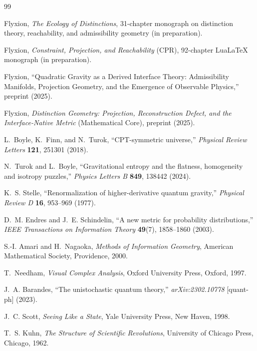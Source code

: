 \documentclass[12pt,a4paper]{book}
\theoremstyle{remark}
\theoremstyle{definition}
\begin{document}
\newpage

\begin{thebibliography}{99}

Flyxion,
\textit{The Ecology of Distinctions},
31-chapter monograph on distinction theory, reachability, and admissibility
geometry (in preparation).

Flyxion,
\textit{Constraint, Projection, and Reachability} (CPR),
92-chapter LuaLaTeX monograph (in preparation).

Flyxion,
``Quadratic Gravity as a Derived Interface Theory:
Admissibility Manifolds, Projection Geometry, and the Emergence of
Observable Physics,''
preprint (2025).

Flyxion,
\textit{Distinction Geometry: Projection, Reconstruction Defect, and the
Interface-Native Metric} (Mathematical Core),
preprint (2025).

L.~Boyle, K.~Finn, and N.~Turok,
``CPT-symmetric universe,''
\textit{Physical Review Letters} \textbf{121}, 251301 (2018).

N.~Turok and L.~Boyle,
``Gravitational entropy and the flatness, homogeneity and isotropy puzzles,''
\textit{Physics Letters B} \textbf{849}, 138442 (2024).

K.~S. Stelle,
``Renormalization of higher-derivative quantum gravity,''
\textit{Physical Review D} \textbf{16}, 953--969 (1977).

D.~M. Endres and J.~E. Schindelin,
``A new metric for probability distributions,''
\textit{IEEE Transactions on Information Theory} \textbf{49}(7),
1858--1860 (2003).

S.-I. Amari and H.~Nagaoka,
\textit{Methods of Information Geometry},
American Mathematical Society, Providence, 2000.

T.~Needham,
\textit{Visual Complex Analysis},
Oxford University Press, Oxford, 1997.

J.~A. Barandes,
``The unistochastic quantum theory,''
\textit{arXiv:2302.10778} [quant-ph] (2023).

J.~C. Scott,
\textit{Seeing Like a State},
Yale University Press, New Haven, 1998.

T.~S. Kuhn,
\textit{The Structure of Scientific Revolutions},
University of Chicago Press, Chicago, 1962.


\end{thebibliography}
\end{document}
